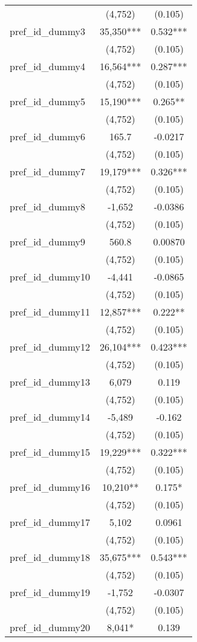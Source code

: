 \documentclass[]{article}
\begin{document}
\begin{tabular}{lcc}
 & (4,752) & (0.105) \\
pref\_id\_dummy3 & 35,350*** & 0.532*** \\
 & (4,752) & (0.105) \\
pref\_id\_dummy4 & 16,564*** & 0.287*** \\
 & (4,752) & (0.105) \\
pref\_id\_dummy5 & 15,190*** & 0.265** \\
 & (4,752) & (0.105) \\
pref\_id\_dummy6 & 165.7 & -0.0217 \\
 & (4,752) & (0.105) \\
pref\_id\_dummy7 & 19,179*** & 0.326*** \\
 & (4,752) & (0.105) \\
pref\_id\_dummy8 & -1,652 & -0.0386 \\
 & (4,752) & (0.105) \\
pref\_id\_dummy9 & 560.8 & 0.00870 \\
 & (4,752) & (0.105) \\
pref\_id\_dummy10 & -4,441 & -0.0865 \\
 & (4,752) & (0.105) \\
pref\_id\_dummy11 & 12,857*** & 0.222** \\
 & (4,752) & (0.105) \\
pref\_id\_dummy12 & 26,104*** & 0.423*** \\
 & (4,752) & (0.105) \\
pref\_id\_dummy13 & 6,079 & 0.119 \\
 & (4,752) & (0.105) \\
pref\_id\_dummy14 & -5,489 & -0.162 \\
 & (4,752) & (0.105) \\
pref\_id\_dummy15 & 19,229*** & 0.322*** \\
 & (4,752) & (0.105) \\
pref\_id\_dummy16 & 10,210** & 0.175* \\
 & (4,752) & (0.105) \\
pref\_id\_dummy17 & 5,102 & 0.0961 \\
 & (4,752) & (0.105) \\
pref\_id\_dummy18 & 35,675*** & 0.543*** \\
 & (4,752) & (0.105) \\
pref\_id\_dummy19 & -1,752 & -0.0307 \\
 & (4,752) & (0.105) \\
pref\_id\_dummy20 & 8,041* & 0.139 \\

\end{tabular}
\end{document}
